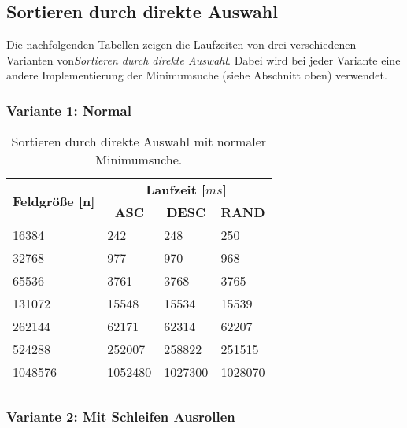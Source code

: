 \subsection{Sortieren durch direkte Auswahl}

Die nachfolgenden Tabellen zeigen die Laufzeiten von drei verschiedenen Varianten von\textit{Sortieren durch direkte Auswahl}. Dabei wird bei jeder Variante eine andere Implementierung der Minimumsuche (siehe Abschnitt oben) verwendet.

\subsubsection{Variante 1: Normal}

\begin{center}
	\begin{longtable}{|p{5cm}|p{3cm}|p{3cm}|p{3cm}|}
		\hline
		
		\multirow{2}{5cm}{\centering \textbf{Feldgröße [n]}} & \multicolumn{3}{|c|}{ \textbf{Laufzeit [$ms$]}} \\\cline{2-4}
		& \multicolumn{1}{|c|}{\textbf{ASC}} & \multicolumn{1}{|c|}{\textbf{DESC}} &\multicolumn{1}{|c|}{\textbf{RAND}} \\
		\hhline{|=|=|=|=|}
		
		16384 & 242 & 248 & 250\\
		\hline
		32768 & 977 & 970 & 968\\
		\hline
		65536 & 3761 & 3768 & 3765\\
		\hline
		131072 & 15548 & 15534 & 15539\\
		\hline
		262144 & 62171 & 62314 & 62207\\
		\hline
		524288 & 252007 & 258822 & 251515\\
		\hline
		1048576 & 1052480 & 1027300 & 1028070\\
		\hline
		
		\caption{Sortieren durch direkte Auswahl mit normaler Minimumsuche.}
		\label{tab:selectionsort-v1}
	\end{longtable}
\end{center}

\subsubsection{Variante 2: Mit Schleifen Ausrollen}

